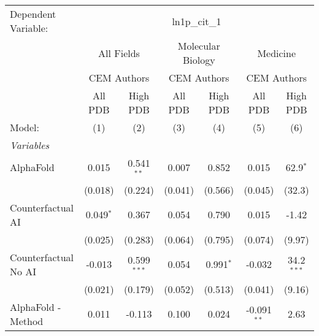 \begingroup
\centering
\begin{tabular}{lcccccc}
   \tabularnewline \midrule \midrule
   Dependent Variable: & \multicolumn{6}{c}{ln1p\_cit\_1}\\
 & \multicolumn{2}{c}{All Fields} & \multicolumn{2}{c}{Molecular Biology} & \multicolumn{2}{c}{Medicine} \\
\cmidrule(lr){2-3} \cmidrule(lr){4-5} \cmidrule(lr){6-7}
 & \multicolumn{2}{c}{CEM Authors} & \multicolumn{2}{c}{CEM Authors} & \multicolumn{2}{c}{CEM Authors} \\
\cmidrule(lr){2-3} \cmidrule(lr){4-5} \cmidrule(lr){6-7}
 & \multicolumn{1}{c}{All PDB} & \multicolumn{1}{c}{High PDB} & \multicolumn{1}{c}{All PDB} & \multicolumn{1}{c}{High PDB} & \multicolumn{1}{c}{All PDB} & \multicolumn{1}{c}{High PDB} \\
\cmidrule(lr){2-2} \cmidrule(lr){3-3} \cmidrule(lr){4-4} \cmidrule(lr){5-5} \cmidrule(lr){6-6} \cmidrule(lr){7-7}
   Model:                                                     & (1)            & (2)           & (3)            & (4)         & (5)           & (6)\\  
   \midrule
   \emph{Variables}\\
   AlphaFold                                                  & 0.015          & 0.541$^{**}$  & 0.007          & 0.852       & 0.015         & 62.9$^{*}$\\   
                                                              & (0.018)        & (0.224)       & (0.041)        & (0.566)     & (0.045)       & (32.3)\\   
   Counterfactual AI                                          & 0.049$^{*}$    & 0.367         & 0.054          & 0.790       & 0.015         & -1.42\\   
                                                              & (0.025)        & (0.283)       & (0.064)        & (0.795)     & (0.074)       & (9.97)\\   
   Counterfactual No AI                                       & -0.013         & 0.599$^{***}$ & 0.054          & 0.991$^{*}$ & -0.032        & 34.2$^{***}$\\   
                                                              & (0.021)        & (0.179)       & (0.052)        & (0.513)     & (0.041)       & (9.16)\\   
   AlphaFold - Method                                         & 0.011          & -0.113        & 0.100          & 0.024       & -0.091$^{**}$ & 2.63\\   

\end{tabular}
